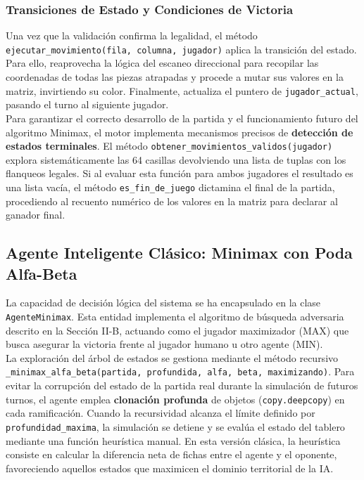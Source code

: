 \documentclass[conference]{IEEEtran}
\begin{document}
\subsubsection{Transiciones de Estado y Condiciones de Victoria}
Una vez que la validación confirma la legalidad, el método \texttt{ejecutar\_movimiento(fila, columna, jugador)} 
aplica la transición del estado. Para ello, reaprovecha la lógica del escaneo direccional 
para recopilar las coordenadas de todas las piezas atrapadas y procede a mutar sus valores
en la matriz, invirtiendo su color. Finalmente, actualiza el puntero 
de \texttt{jugador\_actual}, pasando el turno al siguiente jugador.\\

Para garantizar el correcto desarrollo de la partida y el funcionamiento futuro del 
algoritmo Minimax, el motor implementa mecanismos precisos de \textbf{detección de estados 
terminales}. El método \texttt{obtener\_movimientos\_validos(jugador)} explora sistemáticamente 
las 64 casillas devolviendo una lista de tuplas con los flanqueos legales. Si al evaluar 
esta función para ambos jugadores el resultado es una lista vacía, el 
método \texttt{es\_fin\_de\_juego} dictamina el final de la partida, procediendo 
al recuento numérico de los valores en la matriz para declarar al ganador final.

\subsection{Agente Inteligente Clásico: Minimax con Poda Alfa-Beta}
La capacidad de decisión lógica del sistema se ha encapsulado en la clase \texttt{AgenteMinimax}. Esta entidad implementa el 
algoritmo de búsqueda adversaria descrito en la Sección II-B, actuando como el jugador maximizador (MAX) que busca asegurar 
la victoria frente al jugador humano u otro agente (MIN).\\

La exploración del árbol de estados se gestiona mediante el método recursivo \texttt{\_minimax\_alfa\_beta(partida, profundida, alfa, beta, maximizando)}. Para evitar la 
corrupción del estado de la partida real durante la simulación de futuros turnos, el agente emplea \textbf{clonación profunda} de objetos 
(\texttt{copy.deepcopy}) en cada ramificación. Cuando la recursividad alcanza el límite definido por \texttt{profundidad\_maxima}, 
la simulación se detiene y se evalúa el estado del tablero mediante una función heurística manual. En esta versión clásica, la 
heurística consiste en calcular la diferencia neta de fichas entre el agente y el oponente, favoreciendo aquellos estados que maximicen el dominio territorial de la IA.\\
\end{document}
